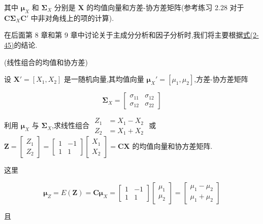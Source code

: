 其中 $\bm{\mu}_X$ 和 $\bm{\Sigma}_X$ 分别是 $\bm{X}$ 的均值向量和方差-协方差矩阵(参考练习 2.28 对于 $\bm{C}\bm{\Sigma}_X\bm{C}'$ 中非对角线上的项的计算).

在后面第 8 章和第 9 章中讨论关于主成分分析和因子分析时,我们将主要根据\hyperref[eq:2-45]{式(2-45)}的结论.

 (线性组合的均值和协方差)

设 $\bm{X}' = [X_1, X_2]$ 是一随机向量,其均值向量 $\bm{\mu}_X' = [\mu_1, \mu_2]$,方差-协方差矩阵

\[
\bm{\Sigma}_X =
\begin{bmatrix}
\sigma_{11} & \sigma_{12} \\
\sigma_{12} & \sigma_{22}
\end{bmatrix}
\]

利用 $\bm{\mu}_X$ 与 $\bm{\Sigma}_X$,求线性组合 $\begin{aligned} Z_1 &= X_1 - X_2 \\ Z_2 &= X_1 + X_2 \end{aligned}$ 或 $\bm{Z} = \begin{bmatrix} Z_1 \\ Z_2 \end{bmatrix} = \begin{bmatrix} 1 & -1 \\ 1 & 1 \end{bmatrix}\begin{bmatrix} X_1 \\ X_2 \end{bmatrix} = \bm{C}\bm{X}$ 的均值向量和协方差矩阵.

这里

\[
\bm{\mu}_Z = E(\bm{Z}) = \bm{C}\bm{\mu}_X = \begin{bmatrix} 1 & -1 \\ 1 & 1 \end{bmatrix}\begin{bmatrix} \mu_1 \\ \mu_2 \end{bmatrix} = \begin{bmatrix} \mu_1 - \mu_2 \\ \mu_1 + \mu_2 \end{bmatrix}
\]

且

